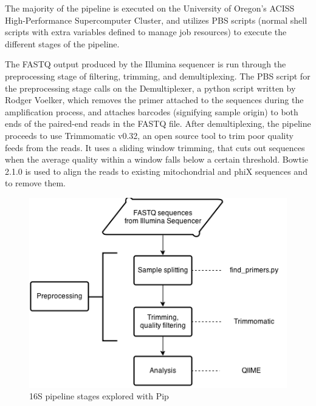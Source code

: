 \documentclass[12pt]{article}
\begin{document}

	The majority of the pipeline is executed on the University of Oregon’s ACISS High-Performance Supercomputer Cluster, and utilizes PBS scripts (normal shell scripts with extra variables defined to manage job resources) to execute the different stages of the pipeline.

	The FASTQ output produced by the Illumina sequencer is run through the preprocessing stage of filtering, trimming, and demultiplexing. The PBS script for the preprocessing stage calls on the Demultiplexer, a python script written by Rodger Voelker, which removes the primer attached to the sequences during the amplification process, and attaches barcodes (signifying sample origin) to both ends of the paired-end reads in the FASTQ file. After demultiplexing, the pipeline proceeds to use Trimmomatic v0.32, an open source tool to trim poor quality feeds from the reads. It uses a sliding window trimming, that cuts out sequences when the average quality within a window falls below a certain threshold. 
	Bowtie 2.1.0 is used to align the reads to existing mitochondrial and phiX sequences and to remove them.
	
	\begin{figure}[h!]
		\centering
		\includegraphics[width=\textwidth]{Pipeline}
		\caption{16S pipeline stages explored with Pip}
		\label{fig:pipeline}
	\end{figure}
	
\end{document}
